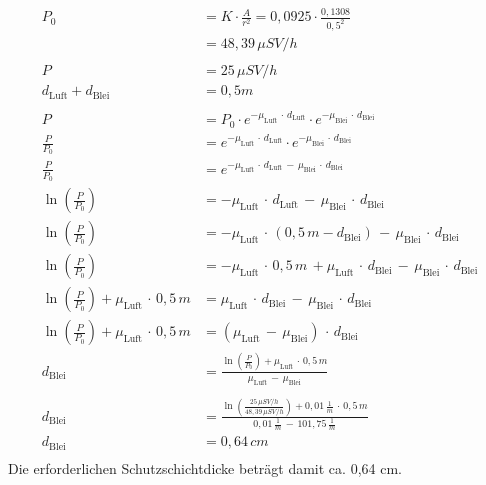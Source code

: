 \documentclass[12pt,german]{article}
\begin{document}
    \begin{align*}
        P_0 &= K \cdot \frac{A}{r^2} = 0,0925 \cdot \frac{0,1308}{{0,5}^2} \\
            &= 48,39\, \mu SV/h \\
        \\
        P &= 25\, \mu SV/h \\
        d_{\text{Luft}} + d_{\text{Blei}} &= 0,5m \\
        \\
        P &= P_0 \cdot e^{-\mu_{\text{Luft}}\, \cdot\, d_{\text{Luft}}} \cdot e^{-\mu_{\text{Blei}}\, \cdot\, d_{\text{Blei}}} \\
        \frac{P}{P_0} &= e^{-\mu_{\text{Luft}}\, \cdot\, d_{\text{Luft}}} \cdot e^{-\mu_{\text{Blei}}\, \cdot\, d_{\text{Blei}}} \\
        \frac{P}{P_0} &= e^{-\mu_{\text{Luft}}\, \cdot\, d_{\text{Luft}}\, -\, \mu_{\text{Blei}}\, \cdot\, d_{\text{Blei}}} \\
        \ln\left(\frac{P}{P_0}\right) &= -\mu_{\text{Luft}}\, \cdot\, d_{\text{Luft}}\, -\, \mu_{\text{Blei}}\, \cdot\, d_{\text{Blei}} \\
        \ln\left(\frac{P}{P_0}\right) &= -\mu_{\text{Luft}}\, \cdot\, (0,5\, m - d_{\text{Blei}})\, -\, \mu_{\text{Blei}}\, \cdot\, d_{\text{Blei}} \\
        \ln\left(\frac{P}{P_0}\right) &= -\mu_{\text{Luft}}\, \cdot\, 0,5\, m\, + \mu_{\text{Luft}}\, \cdot\, d_{\text{Blei}}\, -\, \mu_{\text{Blei}}\, \cdot\, d_{\text{Blei}} \\
        \ln\left(\frac{P}{P_0}\right) + \mu_{\text{Luft}}\, \cdot\, 0,5\, m &= \mu_{\text{Luft}}\, \cdot\, d_{\text{Blei}}\, -\, \mu_{\text{Blei}}\, \cdot\, d_{\text{Blei}} \\
        \ln\left(\frac{P}{P_0}\right) + \mu_{\text{Luft}}\, \cdot\, 0,5\, m &= (\mu_{\text{Luft}}\, -\, \mu_{\text{Blei}})\, \cdot\, d_{\text{Blei}} \\
        d_{\text{Blei}} &= \frac{\ln\left(\frac{P}{P_0}\right) + \mu_{\text{Luft}}\, \cdot\, 0,5\, m}{\mu_{\text{Luft}}\, -\, \mu_{\text{Blei}}} \\
        \\
        d_{\text{Blei}} &= \frac{\ln\left(\frac{25\, \mu SV/h}{48,39\, \mu SV/h}\right) + 0,01\, \frac{1}{m}\, \cdot\, 0,5\, m}{0,01\, \frac{1}{m}\, -\, 101,75\, \frac{1}{m}} \\
        d_{\text{Blei}} &= 0,64\, cm \\
    \end{align*}
    Die erforderlichen Schutzschichtdicke beträgt damit ca. 0,64 cm.
\end{document}
